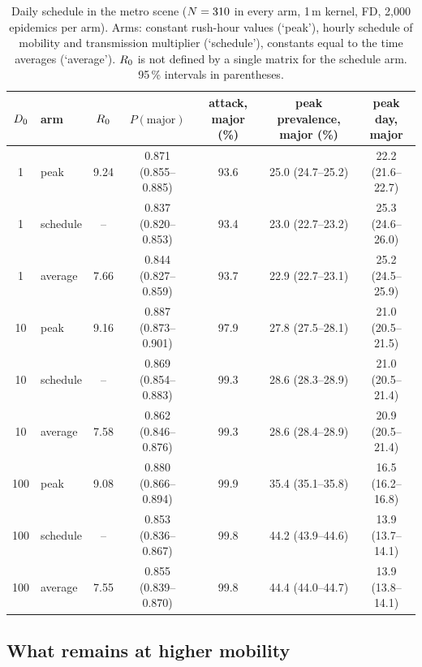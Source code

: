 \begin{table}[tbp]
  \centering\footnotesize\setlength{\tabcolsep}{5pt}
  \caption{Daily schedule in the metro scene ($N=310$ in every arm, 1\,m kernel, FD, 2,000 epidemics per
  arm). Arms: constant rush-hour values (`peak'), hourly schedule of mobility and transmission multiplier
  (`schedule'), constants equal to the time averages (`average'). $R_0$ is not defined by a single matrix
  for the schedule arm. 95\,\% intervals in parentheses.}
  \label{s7_interventions:tab:schedule}
  \begin{tabular}{@{}clccccc@{}}
    \toprule
    $D_0$ & arm & $R_0$ & $P(\text{major})$ & attack, major (\%) & peak prevalence, major (\%) & peak day, major \\
    \midrule
    1 & peak & 9.24 & 0.871 (0.855--0.885) & 93.6 & 25.0 (24.7--25.2) & 22.2 (21.6--22.7) \\
    1 & schedule & -- & 0.837 (0.820--0.853) & 93.4 & 23.0 (22.7--23.2) & 25.3 (24.6--26.0) \\
    1 & average & 7.66 & 0.844 (0.827--0.859) & 93.7 & 22.9 (22.7--23.1) & 25.2 (24.5--25.9) \\
    \midrule
    10 & peak & 9.16 & 0.887 (0.873--0.901) & 97.9 & 27.8 (27.5--28.1) & 21.0 (20.5--21.5) \\
    10 & schedule & -- & 0.869 (0.854--0.883) & 99.3 & 28.6 (28.3--28.9) & 21.0 (20.5--21.4) \\
    10 & average & 7.58 & 0.862 (0.846--0.876) & 99.3 & 28.6 (28.4--28.9) & 20.9 (20.5--21.4) \\
    \midrule
    100 & peak & 9.08 & 0.880 (0.866--0.894) & 99.9 & 35.4 (35.1--35.8) & 16.5 (16.2--16.8) \\
    100 & schedule & -- & 0.853 (0.836--0.867) & 99.8 & 44.2 (43.9--44.6) & 13.9 (13.7--14.1) \\
    100 & average & 7.55 & 0.855 (0.839--0.870) & 99.8 & 44.4 (44.0--44.7) & 13.9 (13.8--14.1) \\
    \bottomrule
  \end{tabular}
\end{table}

\subsection{What remains at higher mobility}\label{s7_interventions:sec:regime}

